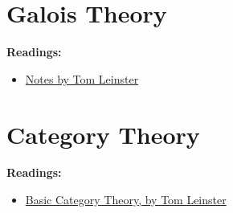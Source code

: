 \chapter{Galois Theory}
\textbf{Readings:}
\begin{itemize}
\item \href{https://www.maths.ed.ac.uk/~tl/gt/gt.pdf}{Notes by Tom Leinster}
\end{itemize}

\chapter{Category Theory}
\textbf{Readings:}
\begin{itemize}
\item \href{https://arxiv.org/pdf/1612.09375.pdf}{Basic Category Theory, by Tom Leinster}
\end{itemize}


